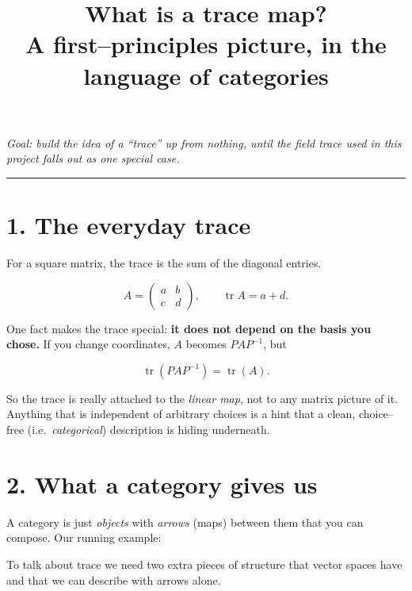 \documentclass[11pt]{article}
\title{\bfseries What is a trace map?\\[2pt]
\large A first--principles picture, in the language of categories}
\author{}
\date{}
\newcommand{\tr}{\operatorname{tr}}
\begin{document}
\maketitle
\vspace{-1.2em}

\begin{center}
\emph{Goal: build the idea of a ``trace'' up from nothing, until the field trace
used in this project falls out as one special case.}
\end{center}

\hrule
\section*{1. The everyday trace}

For a square matrix, the trace is the sum of the diagonal entries.

\[
A=\begin{pmatrix}a&b\\ c&d\end{pmatrix},\qquad \tr A = a+d.
\]

One fact makes the trace special: \textbf{it does not depend on the basis you
chose.} If you change coordinates, $A$ becomes $PAP^{-1}$, but

\[
\tr(PAP^{-1})=\tr(A).
\]

So the trace is really attached to the \emph{linear map}, not to any matrix
picture of it. Anything that is independent of arbitrary choices is a hint that
a clean, choice--free (i.e.\ \emph{categorical}) description is hiding underneath.

\section*{2. What a category gives us}

A category is just \emph{objects} with \emph{arrows} (maps) between them that you
can compose. Our running example:

\begin{center}
\end{center}

To talk about trace we need two extra pieces of structure that vector spaces
have and that we can describe with arrows alone.
\end{document}
